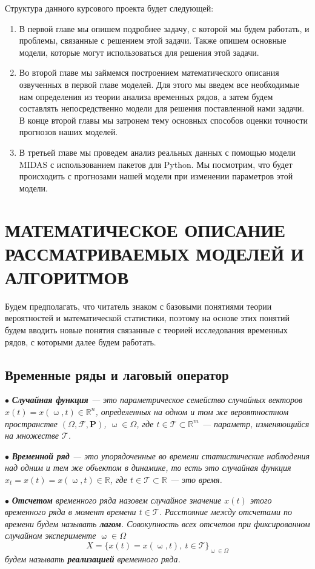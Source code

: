 \documentclass[a4paper, 12pt]{extarticle}
\numberwithin{equation}{subsection}
\newcommand{\Rm}{\mathbb{R}}
\renewcommand{\omega}{\upomega}
\begin{document}
	Структура данного курсового проекта будет следующей:
	\begin{enumerate}
		\item В первой главе мы опишем подробнее задачу, с которой мы будем работать, и проблемы, связанные с решением этой задачи. Также опишем основные модели, которые могут использоваться для решения этой задачи.
		\item Во второй главе мы займемся построением математического описания озвученных в первой главе моделей. Для этого мы введем все необходимые нам определения из теории анализа временных рядов, а затем будем составлять непосредственно модели для решения поставленной нами задачи. В конце второй главы мы затронем тему основных способов оценки точности прогнозов наших моделей.
		\item В третьей главе мы проведем анализ реальных данных с помощью модели MIDAS с использованием пакетов для Python. Мы посмотрим, что будет происходить с прогнозами нашей модели при изменении параметров этой модели.
	\end{enumerate}
	\newpage

	\section{МАТЕМАТИЧЕСКОЕ ОПИСАНИЕ РАССМАТРИВАЕМЫХ МОДЕЛЕЙ И АЛГОРИТМОВ}
	Будем предполагать, что читатель знаком с базовыми понятиями теории вероятностей и математической статистики, поэтому на основе этих понятий будем вводить новые понятия связанные с теорией исследования временных рядов, с которыми далее будем работать.
	\subsection{Временные ряды и лаговый оператор}
	$\bullet$ \textit{\textbf{Случайная функция} --- это параметрическое семейство случайных векторов $x(t) = x(\omega, t)\in \Rm^n$, определенных на одном и том же вероятностном пространстве $(\Omega, \mathcal{F}, \mathbf{P})$, $\omega \in \Omega$, где $t \in \mathcal{T} \subset \Rm^m$ --- параметр, изменяющийся на множестве $\mathcal{T}$.}
	
	$\bullet$ \textit{\textbf{Временной ряд} --- это упорядоченные во времени статистические наблюдения над одним и тем же объектом в динамике, то есть это случайная функция $x_t = x(t) = x(\omega, t)\in\Rm$, где $t \in \mathcal{T} \subset \Rm$ --- это время.}
	
	$\bullet$ \textit{\textbf{Отсчетом} временного ряда назовем случайное значение $x(t)$ этого временного ряда в момент времени $t \in \mathcal{T}$. Расстояние между отсчетами по времени будем называть \textbf{лагом}. Совокупность всех отсчетов при фиксированном случайном эксперименте $\omega \in \Omega$ \begin{equation}
			X = \{x(t) = x(\omega, t),\ t\in \mathcal T \}_{\omega \in \Omega}
		\end{equation} будем называть \textbf{реализацией} временного ряда.}
	
\end{document}

